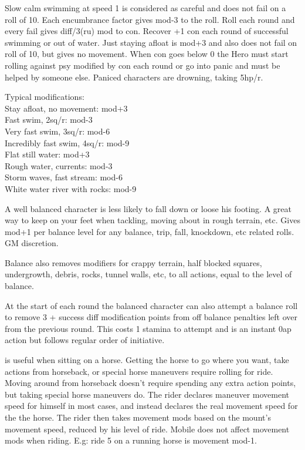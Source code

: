 Slow calm swimming at speed 1 is considered as careful and does not fail on a roll of 10. Each encumbrance factor gives mod-3 to the roll. Roll each round and every fail gives diff/3(ru) mod to con. Recover +1 con each round of successful swimming or out of water. Just staying afloat is mod+3 and also does not fail on roll of 10, but gives no movement. When con goes below 0 the Hero must start rolling against psy modified by con each round or go into panic and must be helped by someone else. Paniced characters are drowning, taking 5hp/r.

Typical modifications:\\
Stay afloat, no movement: mod+3\\
Fast swim, 2sq/r: mod-3\\
Very fast swim, 3sq/r: mod-6\\
Incredibly fast swim, 4sq/r: mod-9\\
Flat still water: mod+3\\
Rough water, currents: mod-3\\
Storm waves, fast stream: mod-6\\
White water river with rocks: mod-9


 A well balanced character is less likely to fall down or loose his footing. A great way to keep on your feet when tackling, moving about in rough terrain, etc. Gives mod+1 per balance level for any balance, trip, fall, knockdown, etc related rolls. GM discretion.

Balance also removes modifiers for crappy terrain, half blocked squares, undergrowth, debris, rocks, tunnel walls, etc, to all actions, equal to the level of balance.

At the start of each round the balanced character can also attempt a balance roll to remove 3 + success diff modification points from off balance penalties left over from the previous round. This costs 1 stamina to attempt and is an instant 0ap action but follows regular order of initiative.


 is useful when sitting on a horse. Getting the horse to go where you want, take actions from horseback, or special horse maneuvers require rolling for ride. Moving around from horseback doesn't require spending any extra action points, but taking special horse maneuvers do. The rider declares maneuver movement speed for himself in most cases, and instead declares the real movement speed for the the horse. The rider then takes movement mods based on the mount's movement speed, reduced by his level of ride. Mobile does not affect movement mods when riding. E.g: ride 5 on a running horse is movement mod-1.

